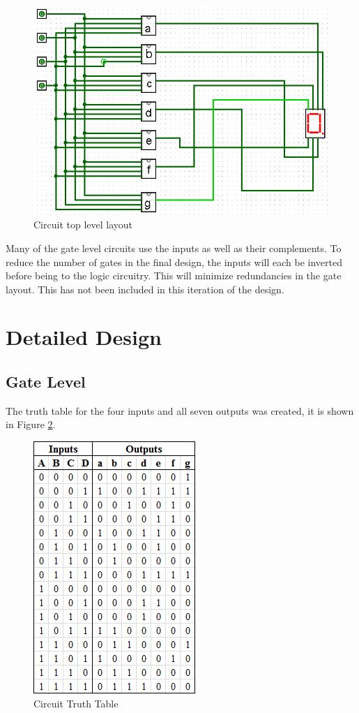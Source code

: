 \documentclass[12pt]{article}
\begin{document}
\begin{figure}[h]
	\centering
	\includegraphics[scale=.8]{topLevelLogicCkt.png}
	\caption{Circuit top level layout}
	\label{fig:TopLevelCkt}
\end{figure}

Many of the gate level circuits use the inputs as well as their complements.  
To reduce the number of gates in the final design, the inputs will each be inverted before being to the logic circuitry.  
This will minimize redundancies in the gate layout.  
This has not been included in this iteration of the design.


\section{Detailed Design}
\subsection{Gate Level}

The truth table for the four inputs and all seven outputs was created, it is shown in Figure \ref{fig:truthTable}.

\begin{figure}[h]
	\centering
	\includegraphics{hex7seg_truthTable.png}
	\caption{Circuit Truth Table}
	\label{fig:truthTable}
\end{figure}
\end{document}
